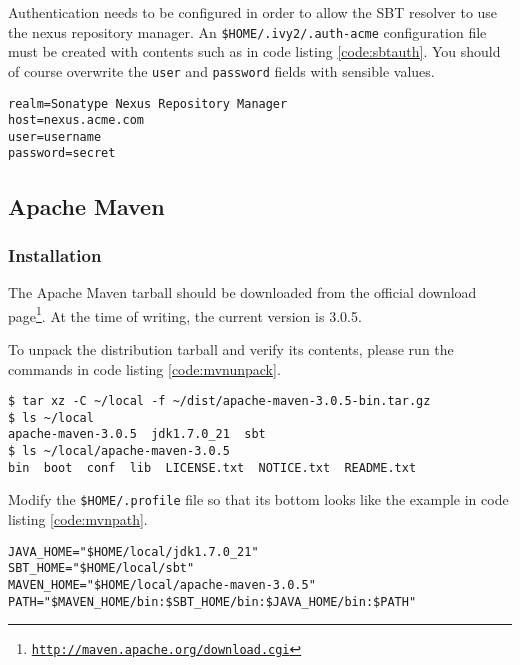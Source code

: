 Authentication needs to be configured in order to allow the \ac{SBT}
resolver to use the nexus repository manager. An
\texttt{\$HOME/.ivy2/.auth-acme} configuration file must be created
with contents such as in code listing \ref{code:sbtauth}. You should of
course overwrite the \texttt{user} and \texttt{password} fields with
sensible values.

\begin{lstlisting}[label=code:sbtauth,caption=Setting SBT authentication
options in the \texttt{\$HOME/.ivy2/.auth-acme} file]
realm=Sonatype Nexus Repository Manager
host=nexus.acme.com
user=username
password=secret
\end{lstlisting}

\subsection{Apache Maven}
\subsubsection{Installation}

The Apache Maven tarball should be downloaded from the official download
page\footnote{\href{http://maven.apache.org/download.cgi}{\texttt{http://maven.apache.org/download.cgi}}}.
At the time of writing, the current version is 3.0.5.

To unpack the distribution tarball and verify its contents, please run
the commands in code listing \ref{code:mvnunpack}.

\begin{lstlisting}[label=code:mvnunpack,caption=Unpacking the tarball to the \texttt{local} directory and checking its contents]
$ tar xz -C ~/local -f ~/dist/apache-maven-3.0.5-bin.tar.gz 
$ ls ~/local
apache-maven-3.0.5  jdk1.7.0_21  sbt
$ ls ~/local/apache-maven-3.0.5
bin  boot  conf  lib  LICENSE.txt  NOTICE.txt  README.txt
\end{lstlisting}

Modify the \texttt{\$HOME/.profile} file so that its bottom looks like
the example in code listing \ref{code:mvnpath}.

\begin{lstlisting}[label=code:mvnpath,caption=Code to add to the bottom of the \texttt{.profile} file]
JAVA_HOME="$HOME/local/jdk1.7.0_21"
SBT_HOME="$HOME/local/sbt"
MAVEN_HOME="$HOME/local/apache-maven-3.0.5"
PATH="$MAVEN_HOME/bin:$SBT_HOME/bin:$JAVA_HOME/bin:$PATH"
\end{lstlisting}

